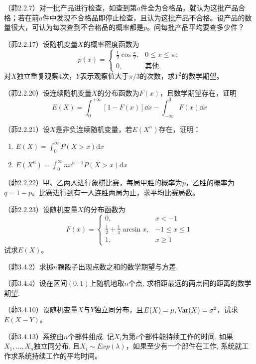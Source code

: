 \begin{problemset}[错题记录]
    \item （茆2.2.7）对一批产品进行检查，如查到第$a$件全为合格品，就认为这批产品合格；若在前$a$件中发现不合格品即停止检查，且认为这批产品不合格。设产品的数量很大，可认为每次查到不合格品的概率都是$p$。问每批产品平均要查多少件？
    \item （茆2.2.17）设随机变量$X$的概率密度函数为
    \[ p(x)=\begin{cases}
            \frac{1}{2} \cos \frac{x}{2}, & 0 \leq x \leq \pi; \\
            0,                            & \text{其他}.
        \end{cases} \]
    对$X$独立重复观察4次，$Y$表示观察值大于$\pi/3$的次数，求$Y^2$的数学期望。
    \item （茆2.2.20）设连续随机变量$X$的分布函数为$F(x)$，且数学期望存在，证明
    \[ E(X) = \int_{0}^{+\infty}[1-F(x)] \dd  x-\int_{-\infty}^{0} F(x) \dd  x \]
    \item （茆2.2.21）设$X$是非负连续随机变量，若$E(X^n)$存在，证明：\begin{enumerate}
        \item$E(X)=\int_0^{\infty}P(X>x) \mathrm{d}x$
        \item$E(X^n)=\int_0^{\infty}n x^{n-1}P(X>x) \mathrm{d}x$
    \end{enumerate}
    \item （茆2.2.22）甲、乙两人进行象棋比赛，每局甲胜的概率为$p$，乙胜的概率为$q=1-p$。比赛进行到有一人连胜两局为止，求平均比赛局数。
    \item （茆2.2.23）设随机变量$X$的分布函数为
    \[ F(x)=\begin{cases}
            0,                                  & x<-1         \\
            \frac{1}{2}+\frac{1}{\pi}\arcsin x, & -1\le x\le 1 \\
            1,                                  & x\ge 1
        \end{cases} \]
    试求$E(X)$。
    \item （茆3.4.2）求掷$n$颗骰子出现点数之和的数学期望与方差.
    \item （茆3.4.4）设在区间$(0,1)$上随机地取$n$个点, 求相距最远的两点间的距离的数学期望.
    \item （茆3.4.10）设随机变量$X$与$Y$独立同分布，且$E(X)=\mu, \operatorname{Var}(X)=\sigma^2$，试求$E(X-Y)$。
    \item （茆3.4.13）系统由$n$个部件组成. 记$X_i$为第$i$个部件能持续工作的时间, 如果$X_1,\ldots,X_n$独立同分布, 且$X_i\sim Exp(\lambda)$，如果至少有一个部件在工作, 系统就工作求系统持续工作的平均时间。

\end{problemset}
